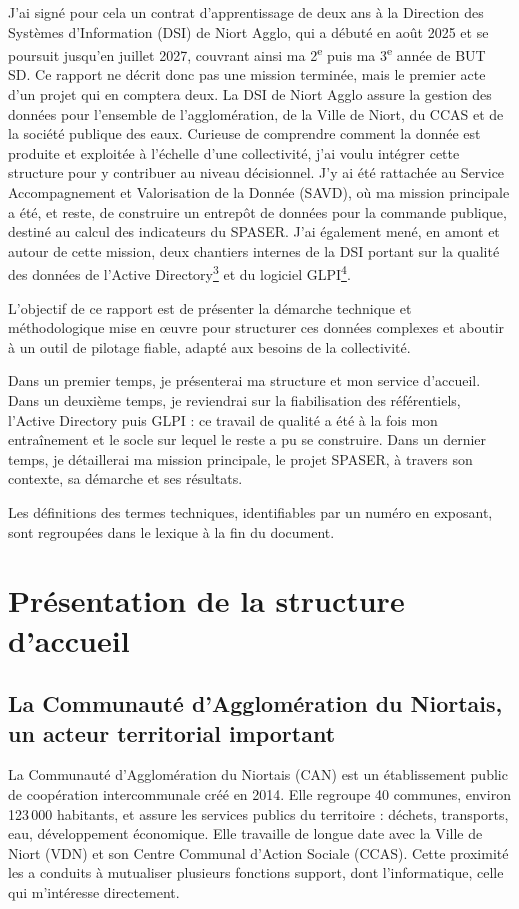 \documentclass[11pt,a4paper]{article}
\newcommand{\lexref}[1]{\hyperlink{lex:#1}{\textsuperscript{#1}}}
\begin{document}
J'ai signé pour cela un contrat d'apprentissage de deux ans à la Direction des Systèmes d'Information (DSI) de Niort Agglo, qui a débuté en août 2025 et se poursuit jusqu'en juillet 2027, couvrant ainsi ma 2\textsuperscript{e} puis ma 3\textsuperscript{e} année de BUT SD. Ce rapport ne décrit donc pas une mission terminée, mais le premier acte d'un projet qui en comptera deux. La DSI de Niort Agglo assure la gestion des données pour l'ensemble de l'agglomération, de la Ville de Niort, du CCAS et de la société publique des eaux. Curieuse de comprendre comment la donnée est produite et exploitée à l'échelle d'une collectivité, j'ai voulu intégrer cette structure pour y contribuer au niveau décisionnel. J'y ai été rattachée au Service Accompagnement et Valorisation de la Donnée (SAVD), où ma mission principale a été, et reste, de construire un entrepôt de données pour la commande publique, destiné au calcul des indicateurs du SPASER. J'ai également mené, en amont et autour de cette mission, deux chantiers internes de la DSI portant sur la qualité des données de l'Active Directory\lexref{3} et du logiciel GLPI\lexref{4}.

L'objectif de ce rapport est de présenter la démarche technique et méthodologique mise en œuvre pour structurer ces données complexes et aboutir à un outil de pilotage fiable, adapté aux besoins de la collectivité.

Dans un premier temps, je présenterai ma structure et mon service d'accueil. Dans un deuxième temps, je reviendrai sur la fiabilisation des référentiels, l'Active Directory puis GLPI : ce travail de qualité a été à la fois mon entraînement et le socle sur lequel le reste a pu se construire. Dans un dernier temps, je détaillerai ma mission principale, le projet SPASER, à travers son contexte, sa démarche et ses résultats.

Les définitions des termes techniques, identifiables par un numéro en exposant, sont regroupées dans le lexique à la fin du document.

\section{Présentation de la structure d'accueil}

\subsection{La Communauté d'Agglomération du Niortais, un acteur territorial important}
La Communauté d'Agglomération du Niortais (CAN) est un établissement public de coopération intercommunale créé en 2014. Elle regroupe 40 communes, environ 123\,000 habitants, et assure les services publics du territoire : déchets, transports, eau, développement économique. Elle travaille de longue date avec la Ville de Niort (VDN) et son Centre Communal d'Action Sociale (CCAS). Cette proximité les a conduits à mutualiser plusieurs fonctions support, dont l'informatique, celle qui m'intéresse directement.
\end{document}
